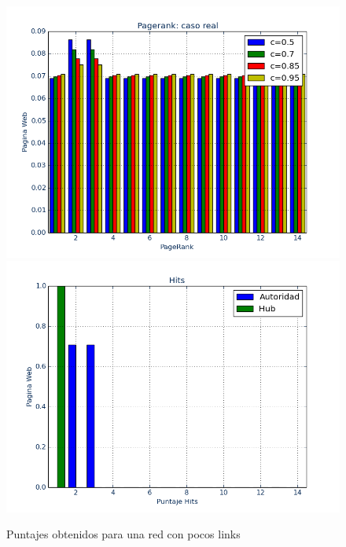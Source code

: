 \documentclass[a4paper]{article}
\begin{document}
\begin{figure}[htbp]
\centering
\includegraphics[scale=0.385]{img/PocosLinksout.png}
\includegraphics[scale=0.385]{img/PocosLinksoutH.png}
\caption{Puntajes obtenidos para una red con pocos links}
\end{figure}
\end{document}
